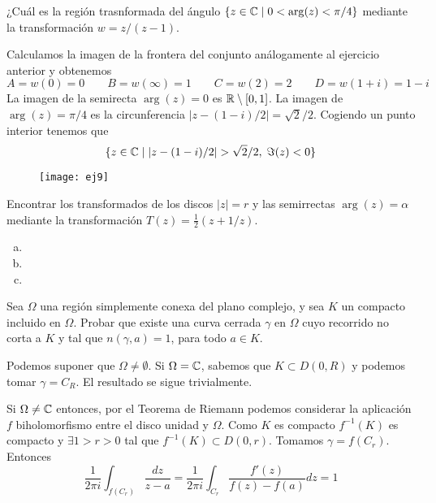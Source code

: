 \documentclass[twoside]{article}
\begin{document}
\begin{ejercicio}{9}
¿Cuál es la región trasnformada del ángulo $\{z\in \mathbb{C}\mid 0<\arg(z)<\pi/4\}$ mediante la transformación $w=z/(z-1)$.
\end{ejercicio}
\begin{solucion}
Calculamos la imagen de la frontera del conjunto análogamente al ejercicio anterior y obtenemos
$$
A = w(0)= 0 \qquad B=w(\infty)=1 \qquad C= w(2)=2 \qquad D =w(1+i) = 1-i 
$$
La imagen de la semirecta $\arg(z)=0$ es $\mathbb{R}\setminus[0,1]$. La imagen de $\arg(z)=\pi/4$ es la circunferencia $|z-(1-i)/2|=\sqrt{2}/2$. Cogiendo un punto interior tenemos que
$$
\{z\in \C \mid |z-(1-i)/2|>\sqrt{2}/2, \;\Im(z)<0\}
$$
\begin{figure}[h]
\texttt{[image: ej9]}
\centering
\end{figure}
\end{solucion}
\newpage

\begin{ejercicio}{10}
Encontrar los transformados de los discos $|z|=r$ y las semirrectas $\arg(z)=\alpha$ mediante la transformación $T(z)=\frac{1}{2}(z+1/z)$.
\end{ejercicio}
\begin{solucion}
\begin{enumerate}[(a)]
\item[]
\item 
\item 
\end{enumerate}
\end{solucion}
\newpage

\begin{ejercicio}{11}
Sea $\Omega$ una región simplemente conexa del plano complejo, y sea $K$ un compacto incluido en $\Omega$. Probar que existe una curva cerrada $\gamma$ en $\Omega$ cuyo recorrido no corta a $K$ y tal que $n(\gamma,a)=1$, para todo $a\in K$.
\end{ejercicio}
\begin{solucion}
Podemos suponer que $\Omega\neq \emptyset$. Si $\Omega = \mathbb{C}$, sabemos que $K\subset D(0,R)$ y podemos tomar $\gamma = C_R$. El resultado se sigue trivialmente.

Si $\Omega \neq \mathbb{C}$ entonces, por el Teorema de Riemann podemos considerar la aplicación $f$ biholomorfismo entre el disco unidad y $\Omega$. Como $K$ es compacto $f^{-1}(K)$ es compacto y $\exists 1>r>0$ tal que $f^{-1}(K)\subset D(0,r)$. Tomamos $\gamma = f(C_r)$. Entonces
$$
\frac{1}{2\pi i}\int_{f(C_r)}\frac{dz}{z-a}=\frac{1}{2\pi i}\int_{C_r}\frac{f'(z)}{f(z)-f(a)}dz = 1
$$
\end{solucion}
\newpage
\end{document}
